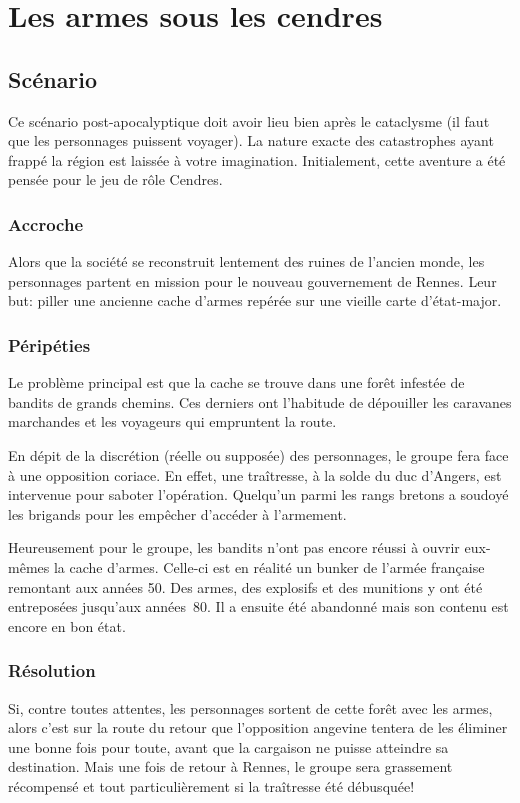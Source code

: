\chapter{Les armes sous les cendres}

\section{Scénario}

Ce scénario post-apocalyptique doit avoir lieu bien après le cataclysme (il faut que les personnages puissent voyager).
La nature exacte des catastrophes ayant frappé la région est laissée à votre imagination.
Initialement, cette aventure a été pensée pour le jeu de rôle Cendres.

\subsection{Accroche}

Alors que la société se reconstruit lentement des ruines de l'ancien monde, les personnages partent en mission pour le nouveau gouvernement de Rennes.
Leur but: piller une ancienne cache d'armes repérée sur une vieille carte d'état-major.

\subsection{Péripéties}

Le problème principal est que la cache se trouve dans une forêt infestée de bandits de grands chemins.
Ces derniers ont l'habitude de dépouiller les caravanes marchandes et les voyageurs qui empruntent la route.

En dépit de la discrétion (réelle ou supposée) des personnages, le groupe fera face à une opposition coriace.
En effet, une traîtresse, à la solde du duc d'Angers, est intervenue pour saboter l'opération.
Quelqu'un parmi les rangs bretons a soudoyé les brigands pour les empêcher d'accéder à l'armement.

Heureusement pour le groupe, les bandits n'ont pas encore réussi à ouvrir eux-mêmes la cache d'armes.
Celle-ci est en réalité un bunker de l'armée française remontant aux années 50.
Des armes, des explosifs et des munitions y ont été entreposées jusqu'aux années 80.
Il a ensuite été abandonné mais son contenu est encore en bon état.

\subsection{Résolution}

Si, contre toutes attentes, les personnages sortent de cette forêt avec les armes, alors c'est sur la route du retour que l'opposition angevine tentera de les éliminer une bonne fois pour toute, avant que la cargaison ne puisse atteindre sa destination.
Mais une fois de retour à Rennes, le groupe sera grassement récompensé et tout particulièrement si la traîtresse été débusquée!
